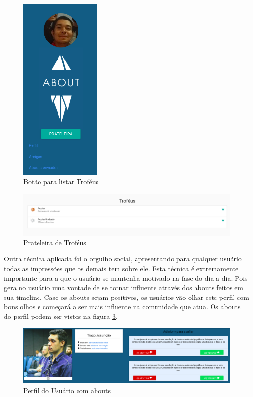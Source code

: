 \begin{figure}[h]
    \centering
    \includegraphics[width=150px, scale=1]{figuras/about_trofeus}
    \caption{Botão para listar Troféus}
    \label{fig:about_trofeus}
\end{figure}


\begin{figure}[h]
    \centering
    \includegraphics[width=450px, scale=1]{figuras/show_trofeus}
    \caption{Prateleira de Troféus}
    \label{fig:show_trofeus}
\end{figure}

Outra técnica aplicada foi o orgulho social, apresentando para qualquer usuário todas as impressões que os demais
tem sobre ele. Esta técnica é extremamente importante para a que o usuário se mantenha motivado
na fase do dia a dia. Pois gera no usuário uma vontade de se tornar influente através dos abouts feitos em sua
timeline. Caso os abouts sejam positivos, os usuários vão olhar este perfil com bons olhos e começará
a ser mais influente na comunidade que atua.
Os abouts do perfil podem ser vistos na figura \ref{fig:show_profile}.

\begin{figure}[h]
    \centering
    \includegraphics[width=450px, scale=1]{figuras/show_profile}
    \caption{Perfil do Usuário com abouts}
    \label{fig:show_profile}
\end{figure}

